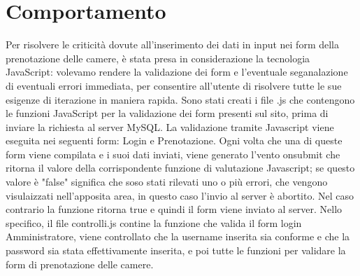 \section{Comportamento} %
Per risolvere le criticità dovute all'inserimento dei dati in input nei form della prenotazione delle camere, è stata presa in considerazione la tecnologia JavaScript: volevamo rendere la validazione dei form e l'eventuale seganalazione di eventuali errori immediata, per consentire all'utente di risolvere tutte le sue esigenze di iterazione in maniera rapida.
Sono stati creati i file .js che contengono le funzioni JavaScript per la validazione dei form presenti sul sito, prima di inviare la richiesta al server MySQL. La validazione tramite Javascript viene eseguita nei seguenti form: Login e Prenotazione. Ogni volta che una di queste form viene compilata e i suoi dati inviati, viene generato l'vento onsubmit che ritorna il valore della corrispondente funzione di valutazione Javascript; se questo valore è "false" significa che soso stati rilevati uno o più errori, che vengono visulaizzati nell'apposita area, in questo caso l'invio al server è abortito. Nel caso contrario la funzione ritorna true e quindi il form viene inviato al server.
Nello specifico, il file controlli.js contine la funzione che valida il form  login Amministratore, viene controllato che la username inserita sia conforme e che la password sia stata effettivamente inserita, e poi tutte le funzioni per validare la form di prenotazione delle camere.

